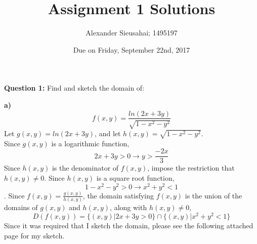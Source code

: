\documentclass{article}
\author{Alexander Sieusahai; 1495197}
\date{Due on Friday, September 22nd, 2017}
\title{Assignment 1 Solutions}
\begin{document}
\maketitle
\textbf{Question 1:} Find and sketch the domain of:

\tab \textbf{a)} 
\[ f(x,y) = \frac{ln(2x+3y)}{\sqrt{1-x^2-y^2}} \]
Let $g(x,y) = ln(2x+3y)$, and let $h(x,y) = \sqrt{1-x^2-y^2}$. \\
Since $g(x,y)$ is a logarithmic function,
\[ 2x+3y > 0 \rightarrow y>\frac{-2x}{3} \]
Since $h(x,y)$ is the denominator of $f(x,y)$, impose the restriction that $h(x,y) \neq 0$. Since $h(x,y)$ is a square root function,
\[1-x^2-y^2>0 \rightarrow x^2+y^2 < 1 \].
Since $f(x,y) = \frac{g(x,y)}{h(x,y)}$, the domain satisfying $f(x,y)$ is the union of the domains of $g(x,y)$ and $h(x,y)$, along with $h(x,y) \neq 0$,
\[ D(f(x,y)) = \{(x,y)|2x+3y>0\} \cap \{(x,y)|x^2+y^2 < 1\}\]
Since it was required that I sketch the domain, please see the following attached page for my sketch.
\end{document}
